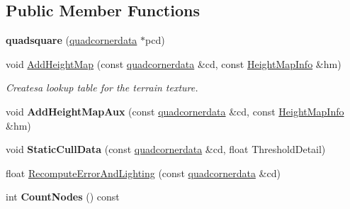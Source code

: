 \subsection*{Public Member Functions}
\begin{DoxyCompactItemize}
\item 
{\bfseries quadsquare} (\hyperlink{structquadcornerdata}{quadcornerdata} $\ast$pcd)\hypertarget{classquadsquare_a97df4c071e8427eba615fb52aad0ea4c}{}\label{classquadsquare_a97df4c071e8427eba615fb52aad0ea4c}

\item 
void \hyperlink{classquadsquare_a3f1cb2797e963833c7290acfe9b103f9}{Add\+Height\+Map} (const \hyperlink{structquadcornerdata}{quadcornerdata} \&cd, const \hyperlink{structHeightMapInfo}{Height\+Map\+Info} \&hm)\hypertarget{classquadsquare_a3f1cb2797e963833c7290acfe9b103f9}{}\label{classquadsquare_a3f1cb2797e963833c7290acfe9b103f9}

\begin{DoxyCompactList}\small\item\em Createsa lookup table for the terrain texture. \end{DoxyCompactList}\item 
void {\bfseries Add\+Height\+Map\+Aux} (const \hyperlink{structquadcornerdata}{quadcornerdata} \&cd, const \hyperlink{structHeightMapInfo}{Height\+Map\+Info} \&hm)\hypertarget{classquadsquare_a4cfb15573c1f2659f403b06ba11f584e}{}\label{classquadsquare_a4cfb15573c1f2659f403b06ba11f584e}

\item 
void {\bfseries Static\+Cull\+Data} (const \hyperlink{structquadcornerdata}{quadcornerdata} \&cd, float Threshold\+Detail)\hypertarget{classquadsquare_ae86fcf6236f031a2448d50fe8ca08393}{}\label{classquadsquare_ae86fcf6236f031a2448d50fe8ca08393}

\item 
float \hyperlink{classquadsquare_aa193d3026addcd349eb5d51e2d050697}{Recompute\+Error\+And\+Lighting} (const \hyperlink{structquadcornerdata}{quadcornerdata} \&cd)
\item 
int {\bfseries Count\+Nodes} () const \hypertarget{classquadsquare_a2639c7b1df79007040d3f23cf2b1a05f}{}\label{classquadsquare_a2639c7b1df79007040d3f23cf2b1a05f}


\end{DoxyCompactItemize}
